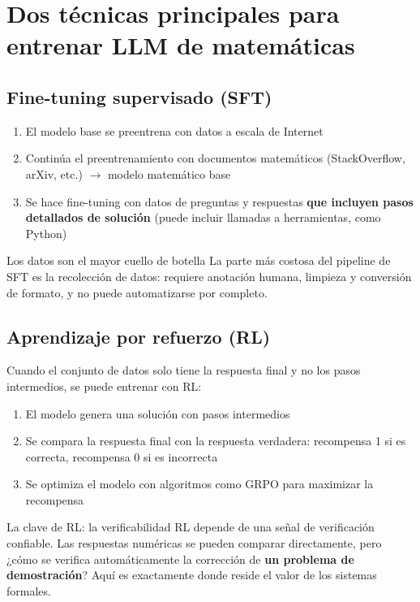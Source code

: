 \documentclass[a4paper]{article}
\begin{document}
\section{Dos técnicas principales para entrenar LLM de matemáticas}

\subsection{Fine-tuning supervisado (SFT)}

\begin{enumerate}
    \item El modelo base se preentrena con datos a escala de Internet
    \item Continúa el preentrenamiento con documentos matemáticos (StackOverflow, arXiv, etc.) $\to$ modelo matemático base
    \item Se hace fine-tuning con datos de preguntas y respuestas \textbf{que incluyen pasos detallados de solución} (puede incluir llamadas a herramientas, como Python)
\end{enumerate}

\begin{warningbox}{Los datos son el mayor cuello de botella}
La parte más costosa del pipeline de SFT es la recolección de datos: requiere anotación humana, limpieza y conversión de formato, y no puede automatizarse por completo.
\end{warningbox}

\subsection{Aprendizaje por refuerzo (RL)}

Cuando el conjunto de datos solo tiene la respuesta final y no los pasos intermedios, se puede entrenar con RL:
\begin{enumerate}
    \item El modelo genera una solución con pasos intermedios
    \item Se compara la respuesta final con la respuesta verdadera: recompensa 1 si es correcta, recompensa 0 si es incorrecta
    \item Se optimiza el modelo con algoritmos como GRPO para maximizar la recompensa
\end{enumerate}

\begin{importantbox}{La clave de RL: la verificabilidad}
RL depende de una señal de verificación confiable. Las respuestas numéricas se pueden comparar directamente, pero ¿cómo se verifica automáticamente la corrección de \textbf{un problema de demostración}? Aquí es exactamente donde reside el valor de los sistemas formales.
\end{importantbox}
\end{document}
